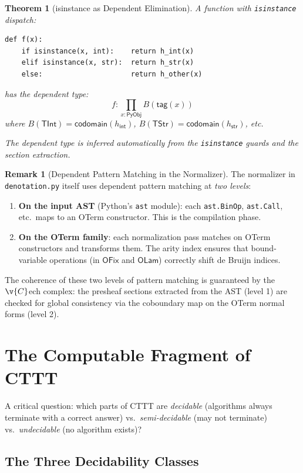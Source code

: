 \documentclass[11pt,a4paper]{report}
\theoremstyle{definition}
\newtheorem{remark}[definition]{Remark}
\theoremstyle{plain}
\newtheorem{theorem}[definition]{Theorem}
\newcommand{\PyObj}{\mathsf{PyObj}}
\begin{document}
\begin{theorem}[isinstance as Dependent Elimination]
\label{thm:isinstance-dep}
A function with \texttt{isinstance} dispatch:
\begin{lstlisting}
def f(x):
    if isinstance(x, int):    return h_int(x)
    elif isinstance(x, str):  return h_str(x)
    else:                     return h_other(x)
\end{lstlisting}
has the dependent type:
\[
  f : \prod_{x : \PyObj} B(\mathsf{tag}(x))
\]
where $B(\mathsf{TInt}) = \mathsf{codomain}(h_\mathsf{int})$,
$B(\mathsf{TStr}) = \mathsf{codomain}(h_\mathsf{str})$, etc.

The dependent type is inferred automatically from the \texttt{isinstance}
guards and the section extraction.
\end{theorem}

\begin{remark}[Dependent Pattern Matching in the Normalizer]
The normalizer in \texttt{denotation.py} itself uses dependent pattern
matching at \emph{two levels}:
\begin{enumerate}
  \item \textbf{On the input AST} (Python's \texttt{ast} module):
    each \texttt{ast.BinOp}, \texttt{ast.Call}, etc.\ maps to an
    OTerm constructor.  This is the compilation phase.
  \item \textbf{On the OTerm family}: each normalization pass
    matches on OTerm constructors and transforms them.  The arity
    index ensures that bound-variable operations (in $\mathsf{OFix}$
    and $\mathsf{OLam}$) correctly shift de Bruijn indices.
\end{enumerate}
The coherence of these two levels of pattern matching is guaranteed
by the $\v{C}$ech complex: the presheaf sections extracted from the
AST (level 1) are checked for global consistency via the coboundary
map on the OTerm normal forms (level 2).
\end{remark}


\chapter{The Computable Fragment of CTTT}
\label{ch:computable}

A critical question: which parts of CTTT are \emph{decidable}
(algorithms always terminate with a correct answer) vs.\
\emph{semi-decidable} (may not terminate) vs.\ \emph{undecidable}
(no algorithm exists)?

\section{The Three Decidability Classes}
\end{document}
